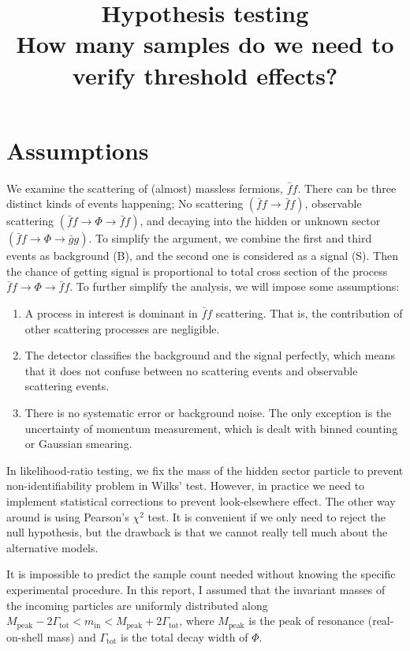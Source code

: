 \documentclass[10pt]{article}
\theoremstyle{definition}
\theoremstyle{remark}
\begin{document}
	\title{Hypothesis testing\\ \small How many samples do we need to verify threshold effects?}
	\maketitle
	\section{Assumptions}
	We examine the scattering of (almost) massless fermions, $\bar{f}f$.
	There can be three distinct kinds of events happening;
	No scattering $(\bar{f}f\to\bar{f}f)$, observable scattering $(\bar{f}f\to\Phi\to\bar{f}f)$, and decaying into the hidden or unknown sector $(\bar{f}f\to\Phi\to\bar{g}g)$.
	To simplify the argument, we combine the first and third events as background (B), and the second one is considered as a signal (S).
	Then the chance of getting signal is proportional to total cross section of the process $\bar{f}f\to\Phi\to\bar{f}f$.
	To further simplify the analysis, we will impose some assumptions:
	\begin{enumerate}
		\item A process in interest is dominant in $\bar{f}f$ scattering.
		That is, the contribution of other scattering processes are negligible.
		
		\item The detector classifies the background and the signal perfectly, which means that it does not confuse between no scattering events and observable scattering events.
		
		\item There is no systematic error or background noise.
		The only exception is the uncertainty of momentum measurement, which is dealt with binned counting or Gaussian smearing.
	\end{enumerate}
	In likelihood-ratio testing, we fix the mass of the hidden sector particle to prevent non-identifiability problem in Wilks' test\cite{algeri2020searching}.
	However, in practice we need to implement statistical corrections to prevent look-elsewhere effect.
	The other way around is using Pearson's $\chi^{2}$ test.
	It is convenient if we only need to reject the null hypothesis, but the drawback is that we cannot really tell much about the alternative models.
	
	It is impossible to predict the sample count needed without knowing the specific experimental procedure.
	In this report, I assumed that the invariant masses of the incoming particles are uniformly distributed along $M_{\mathrm{peak}}-2\Gamma_{\mathrm{tot}}<m_{\mathrm{in}}<M_{\mathrm{peak}}+2\Gamma_{\mathrm{tot}}$, where $M_{\mathrm{peak}}$ is the peak of resonance (real-on-shell mass) and $\Gamma_{\mathrm{tot}}$ is the total decay width of $\Phi$.
	
\end{document}
